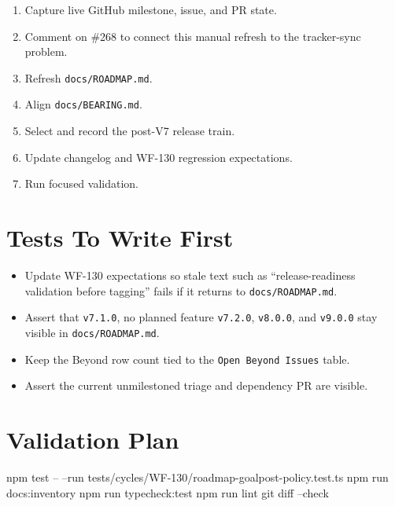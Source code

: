 \begin{enumerate}
\def\labelenumi{\arabic{enumi}.}
\tightlist
\item
  Capture live GitHub milestone, issue, and PR state.
\item
  Comment on \#268 to connect this manual refresh to the tracker-sync problem.
\item
  Refresh \texttt{d\allowbreak{}o\allowbreak{}c\allowbreak{}s\allowbreak{}/\allowbreak{}R\allowbreak{}O\allowbreak{}A\allowbreak{}D\allowbreak{}M\allowbreak{}A\allowbreak{}P\allowbreak{}.\allowbreak{}m\allowbreak{}d}.
\item
  Align \texttt{d\allowbreak{}o\allowbreak{}c\allowbreak{}s\allowbreak{}/\allowbreak{}B\allowbreak{}E\allowbreak{}A\allowbreak{}R\allowbreak{}I\allowbreak{}N\allowbreak{}G\allowbreak{}.\allowbreak{}m\allowbreak{}d}.
\item
  Select and record the post-V7 release train.
\item
  Update changelog and WF-130 regression expectations.
\item
  Run focused validation.
\end{enumerate}

\section{Tests To Write First}\label{record-213-tests-to-write-first}

\begin{itemize}
\tightlist
\item
  Update WF-130 expectations so stale text such as ``release-readiness validation before tagging'' fails if it returns to \texttt{d\allowbreak{}o\allowbreak{}c\allowbreak{}s\allowbreak{}/\allowbreak{}R\allowbreak{}O\allowbreak{}A\allowbreak{}D\allowbreak{}M\allowbreak{}A\allowbreak{}P\allowbreak{}.\allowbreak{}m\allowbreak{}d}.
\item
  Assert that \texttt{v\allowbreak{}7\allowbreak{}.\allowbreak{}1\allowbreak{}.\allowbreak{}0}, no planned feature \texttt{v\allowbreak{}7\allowbreak{}.\allowbreak{}2\allowbreak{}.\allowbreak{}0}, \texttt{v\allowbreak{}8\allowbreak{}.\allowbreak{}0\allowbreak{}.\allowbreak{}0}, and \texttt{v\allowbreak{}9\allowbreak{}.\allowbreak{}0\allowbreak{}.\allowbreak{}0} stay visible in \texttt{d\allowbreak{}o\allowbreak{}c\allowbreak{}s\allowbreak{}/\allowbreak{}R\allowbreak{}O\allowbreak{}A\allowbreak{}D\allowbreak{}M\allowbreak{}A\allowbreak{}P\allowbreak{}.\allowbreak{}m\allowbreak{}d}.
\item
  Keep the Beyond row count tied to the \texttt{O\allowbreak{}p\allowbreak{}e\allowbreak{}n\allowbreak{} \allowbreak{}B\allowbreak{}e\allowbreak{}y\allowbreak{}o\allowbreak{}n\allowbreak{}d\allowbreak{} \allowbreak{}I\allowbreak{}s\allowbreak{}s\allowbreak{}u\allowbreak{}e\allowbreak{}s} table.
\item
  Assert the current unmilestoned triage and dependency PR are visible.
\end{itemize}

\section{Validation Plan}\label{record-213-validation-plan}

\begin{CodeBlock}
npm test -- --run tests/cycles/WF-130/roadmap-goalpost-policy.test.ts
npm run docs:inventory
npm run typecheck:test
npm run lint
git diff --check
\end{CodeBlock}

